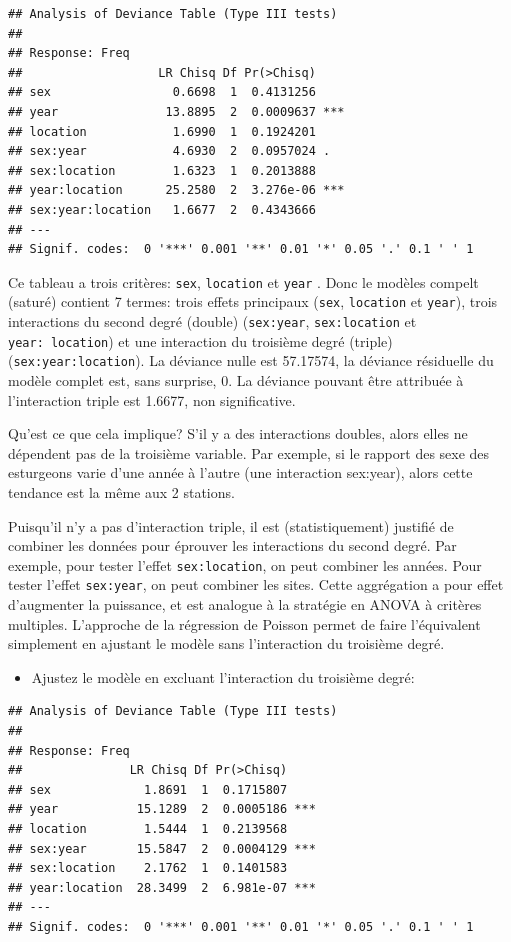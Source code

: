 \documentclass[12pt,]{book}
\providecommand{\tightlist}{%
  \setlength{\itemsep}{0pt}\setlength{\parskip}{0pt}}
\begin{document}
\begin{verbatim}
## Analysis of Deviance Table (Type III tests)
## 
## Response: Freq
##                   LR Chisq Df Pr(>Chisq)    
## sex                 0.6698  1  0.4131256    
## year               13.8895  2  0.0009637 ***
## location            1.6990  1  0.1924201    
## sex:year            4.6930  2  0.0957024 .  
## sex:location        1.6323  1  0.2013888    
## year:location      25.2580  2  3.276e-06 ***
## sex:year:location   1.6677  2  0.4343666    
## ---
## Signif. codes:  0 '***' 0.001 '**' 0.01 '*' 0.05 '.' 0.1 ' ' 1
\end{verbatim}

Ce tableau a trois critères: \texttt{sex}, \texttt{location} et \texttt{year} . Donc le modèles compelt (saturé) contient 7 termes: trois effets principaux (\texttt{sex}, \texttt{location} et \texttt{year}), trois interactions du second degré (double) (\texttt{sex:year}, \texttt{sex:location} et \texttt{year:\ location}) et une interaction du troisième degré (triple)(\texttt{sex:year:location}). La déviance nulle est 57.17574, la déviance résiduelle du modèle complet est, sans surprise, 0. La déviance pouvant être attribuée à l'interaction triple est 1.6677, non significative.

Qu'est ce que cela implique? S'il y a des interactions doubles, alors elles ne dépendent pas de la troisième variable. Par exemple, si le rapport des sexe des esturgeons varie d'une année à l'autre (une interaction sex:year), alors cette tendance est la même aux 2 stations.

Puisqu'il n'y a pas d'interaction triple, il est (statistiquement) justifié de combiner les données pour éprouver les interactions du second degré. Par exemple, pour tester l'effet \texttt{sex:location}, on peut combiner les années. Pour tester l'effet \texttt{sex:year}, on peut combiner les sites. Cette aggrégation a pour effet d'augmenter la puissance, et est analogue à la stratégie en ANOVA à critères multiples. L'approche de la régression de Poisson permet de faire l'équivalent simplement en ajustant le modèle sans l'interaction du troisième degré.

\begin{itemize}
\tightlist
\item
  Ajustez le modèle en excluant l'interaction du troisième degré:
\end{itemize}

\begin{verbatim}
## Analysis of Deviance Table (Type III tests)
## 
## Response: Freq
##               LR Chisq Df Pr(>Chisq)    
## sex             1.8691  1  0.1715807    
## year           15.1289  2  0.0005186 ***
## location        1.5444  1  0.2139568    
## sex:year       15.5847  2  0.0004129 ***
## sex:location    2.1762  1  0.1401583    
## year:location  28.3499  2  6.981e-07 ***
## ---
## Signif. codes:  0 '***' 0.001 '**' 0.01 '*' 0.05 '.' 0.1 ' ' 1
\end{verbatim}
\end{document}

